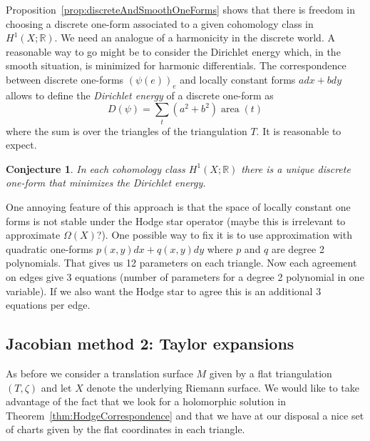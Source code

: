 \documentclass[a4paper,12pt]{article}
\def\bR{\mathbb{R}}
\def\area{\operatorname{area}}
\newtheorem{conjecture}[definition]{Conjecture}
\begin{document}
Proposition~\ref{prop:discreteAndSmoothOneForms} shows that there is freedom
in choosing a discrete one-form associated to a given cohomology class in $H^1(X; \bR)$.
We need an analogue of a harmonicity in the discrete world.
A reasonable way to go might be to consider the Dirichlet
energy which, in the smooth situation, is minimized for harmonic differentials.
The correspondence between discrete one-forms $(\psi(e))_e$ and locally constant
forms $adx + bdy$ allows to define the \emph{Dirichlet energy} of a discrete one-form as
\[
D(\psi) = \sum_{t} (a^2 + b^2) \area(t)
\]
where the sum is over the triangles of the triangulation $T$.
It is reasonable to expect.
\begin{conjecture}
In each cohomology class $H^1(X; \bR)$ there is a unique discrete one-form
that minimizes the Dirichlet energy.
\end{conjecture}

One annoying feature of this approach is that the space of locally constant
one forms is not stable under the Hodge star operator (maybe this is
irrelevant to approximate $\Omega(X)$?). One possible way to fix it is to use
approximation with quadratic one-forms $p(x,y) dx + q(x,y) dy$ where $p$ and $q$
are degree 2 polynomials. That gives us 12 parameters on each triangle. Now each
agreement on edges give 3 equations (number of parameters for a degree 2 polynomial
in one variable). If we also want the Hodge star to agree this is an additional
3 equations per edge.


\subsection{Jacobian method 2: Taylor expansions}
As before we consider a translation surface $M$ given by a flat triangulation $(T, \zeta)$
and let $X$ denote the underlying Riemann surface. We would like to take advantage of
the fact that we look for a holomorphic solution in Theorem~\ref{thm:HodgeCorrespondence}
and that we have at our disposal a nice set of charts given by the flat coordinates in each triangle.
\end{document}
